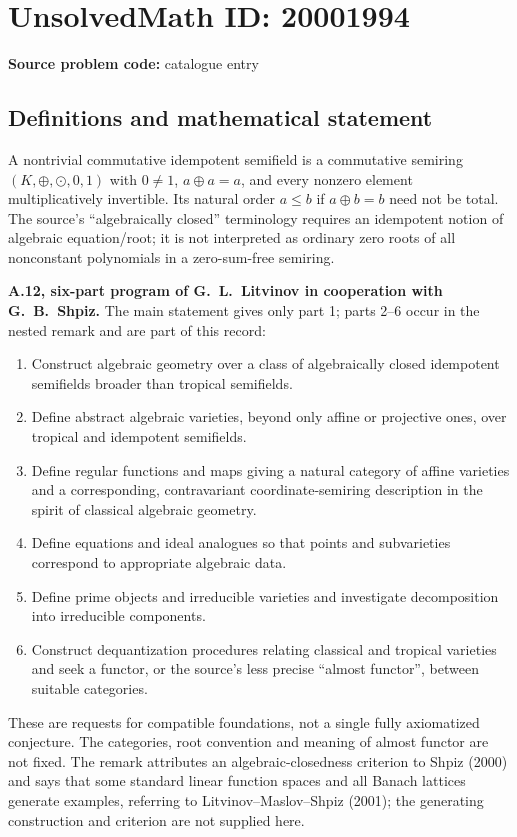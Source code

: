 \documentclass[11pt]{article}
\begin{document}
\section*{UnsolvedMath ID: 20001994}
\textbf{Source problem code:} catalogue entry
\subsection{Definitions and mathematical statement}
A nontrivial commutative idempotent semifield is a commutative semiring $(K,\oplus,\odot,0,1)$ with $0\ne1$, $a\oplus a=a$, and every nonzero element multiplicatively invertible. Its natural order $a\le b$ if $a\oplus b=b$ need not be total. The source's ``algebraically closed'' terminology requires an idempotent notion of algebraic equation/root; it is not interpreted as ordinary zero roots of all nonconstant polynomials in a zero-sum-free semiring.

\textbf{A.12, six-part program of G.~L.~Litvinov in cooperation with G.~B.~Shpiz.} The main statement gives only part 1; parts 2--6 occur in the nested remark and are part of this record:
\begin{enumerate}
\item Construct algebraic geometry over a class of algebraically closed idempotent semifields broader than tropical semifields.
\item Define abstract algebraic varieties, beyond only affine or projective ones, over tropical and idempotent semifields.
\item Define regular functions and maps giving a natural category of affine varieties and a corresponding, contravariant coordinate-semiring description in the spirit of classical algebraic geometry.
\item Define equations and ideal analogues so that points and subvarieties correspond to appropriate algebraic data.
\item Define prime objects and irreducible varieties and investigate decomposition into irreducible components.
\item Construct dequantization procedures relating classical and tropical varieties and seek a functor, or the source's less precise ``almost functor'', between suitable categories.
\end{enumerate}
These are requests for compatible foundations, not a single fully axiomatized conjecture. The categories, root convention and meaning of almost functor are not fixed. The remark attributes an algebraic-closedness criterion to Shpiz (2000) and says that some standard linear function spaces and all Banach lattices generate examples, referring to Litvinov--Maslov--Shpiz (2001); the generating construction and criterion are not supplied here.
\end{document}

